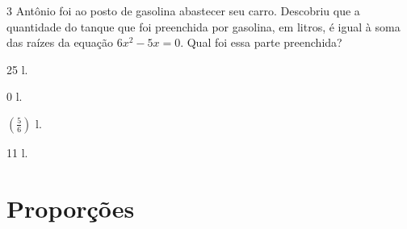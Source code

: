 {{%



\num{3} Antônio foi ao posto de gasolina abastecer seu carro. Descobriu
que a quantidade do tanque que foi preenchida por gasolina, em litros, é igual à
soma das raízes da equação $6x^2 - 5x = 0$. Qual foi essa parte preenchida?

\begin{escolha}[itemsep=0pt]
\item 25 l.
\item 0 l.
\item $(\frac{5}{6})$ l.
\item 11 l.
\end{escolha}


















\chapter{Proporções}

}}
